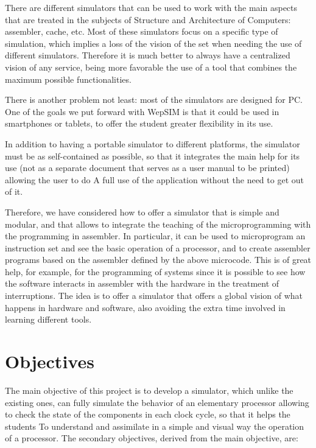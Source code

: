 There are different simulators that can be used to work with the main aspects that are treated in the subjects of Structure and Architecture of Computers: assembler, cache, etc. Most of these simulators focus on a specific type of simulation, which implies a loss of the vision of the set when needing the use of different simulators. Therefore it is much better to always have a centralized vision of any service, being more favorable the use of a tool that combines the maximum possible functionalities.

There is another problem not least: most of the simulators are designed for PC. One of the goals we put forward with WepSIM is that it could be used in smartphones or tablets, to offer the student greater flexibility in its use.

In addition to having a portable simulator to different platforms, the simulator must be as self-contained as possible, so that it integrates the main help for its use (not as a separate document that serves as a user manual to be printed) allowing the user to do A full use of the application without the need to get out of it.

Therefore, we have considered how to offer a simulator that is simple and modular, and that allows to integrate the teaching of the microprogramming with the programming in assembler. In particular, it can be used to microprogram an instruction set and see the basic operation of a processor, and to create assembler programs based on the assembler defined by the above microcode. This is of great help, for example, for the programming of systems since it is possible to see how the software interacts in assembler with the hardware in the treatment of interruptions. The idea is to offer a simulator that offers a global vision of what happens in hardware and software, also avoiding the extra time involved in learning different tools.


\section*{Objectives}

The main objective of this project is to develop a simulator, which unlike the existing ones, can fully simulate the behavior of an elementary processor allowing to check the state of the components in each clock cycle, so that it helps the students To understand and assimilate in a simple and visual way the operation of a processor. The secondary objectives, derived from the main objective, are:

